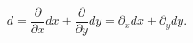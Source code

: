 \begin{equation}
d=\frac \partial {\partial x}dx+\frac \partial {\partial y}dy=\partial
_xdx+\partial _ydy.
\end{equation}

